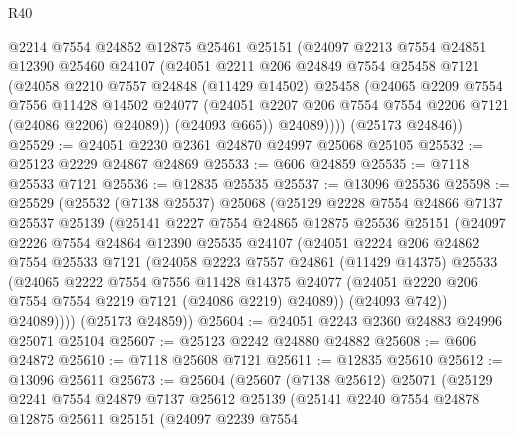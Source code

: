 \begin{lexlean}{R40}
\begin{coremodule}
          @2214
          @7554
          @24852
          @12875
          @25461
          @25151
          (@24097
            @2213
            @7554
            @24851
            @12390
            @25460
            @24107
            (@24051
              @2211
              @206
              @24849
              @7554
              @25458
              @7121
              (@24058
                @2210
                @7557
                @24848
                (@11429 @14502)
                @25458
                (@24065
                  @2209
                  @7554
                  @7556
                  @11428
                  @14502
                  @24077
                  (@24051 @2207 @206 @7554 @7554 @2206 @7121 (@24086 @2206) @24089))
                (@24093 @665))
              @24089))))
      (@25173 @24846))
@25529 := @24051 @2230 @2361 @24870 @24997 @25068 @25105
@25532 := @25123 @2229 @24867 @24869
@25533 := @606 @24859
@25535 := @7118 @25533 @7121
@25536 := @12835 @25535
@25537 := @13096 @25536
@25598 := @25529
    (@25532
      (@7138 @25537)
      @25068
      (@25129
        @2228
        @7554
        @24866
        @7137
        @25537
        @25139
        (@25141
          @2227
          @7554
          @24865
          @12875
          @25536
          @25151
          (@24097
            @2226
            @7554
            @24864
            @12390
            @25535
            @24107
            (@24051
              @2224
              @206
              @24862
              @7554
              @25533
              @7121
              (@24058
                @2223
                @7557
                @24861
                (@11429 @14375)
                @25533
                (@24065
                  @2222
                  @7554
                  @7556
                  @11428
                  @14375
                  @24077
                  (@24051 @2220 @206 @7554 @7554 @2219 @7121 (@24086 @2219) @24089))
                (@24093 @742))
              @24089))))
      (@25173 @24859))
@25604 := @24051 @2243 @2360 @24883 @24996 @25071 @25104
@25607 := @25123 @2242 @24880 @24882
@25608 := @606 @24872
@25610 := @7118 @25608 @7121
@25611 := @12835 @25610
@25612 := @13096 @25611
@25673 := @25604
    (@25607
      (@7138 @25612)
      @25071
      (@25129
        @2241
        @7554
        @24879
        @7137
        @25612
        @25139
        (@25141
          @2240
          @7554
          @24878
          @12875
          @25611
          @25151
          (@24097
            @2239
            @7554

\end{coremodule}
\end{lexlean}
